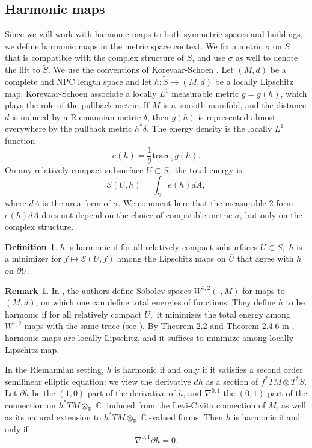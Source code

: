 \documentclass[10pt]{amsart}
\newcommand{\R}{\mathbb R}
\theoremstyle{definition}
\newtheorem{defn}[thm]{Definition}
\newtheorem{remark}[thm]{Remark}
\DeclareMathOperator{\C}{\mathbb{C}}
\begin{document}
\subsection{Harmonic maps}\label{hmapsdefinitions}
Since we will work with harmonic maps to both symmetric spaces and buildings, we define harmonic maps in the metric space context. We fix a metric $\sigma$ on $S$ that is compatible with the complex structure of $S$, and use $\sigma$ as well to denote the lift to $\tilde{S}$. We use the conventions of Korevaar-Schoen \cite{KS}. Let $(M,d)$ be a complete and NPC length space and let $h:\tilde{S}\to (M,d)$ be a locally Lipschitz map. Korevaar-Schoen \cite[Theorem 2.3.2]{KS} associate a locally $L^1$ measurable metric $g=g(h)$, which plays the role of the pullback metric. If $M$ is a smooth manifold, and the distance $d$ is induced by a Riemannian metric $\delta$, then $g(h)$ is represented almost everywhere by the pullback metric $h^*\delta$. The energy density is the locally $L^1$ function 
\begin{equation}\label{mease}
    e(h)=\frac{1}{2}\textrm{trace}_\sigma g(h).
\end{equation}
On any relatively compact subsurface $U\subset S,$ the total energy is
\begin{equation}\label{tot}
    \mathcal{E}(U,h) = \int_U e(h)dA,
\end{equation}
where $dA$ is the area form of $\sigma$. We comment here that the measurable $2$-form $e(h)dA$ does not depend on the choice of compatible metric $\sigma$, but only on the complex structure. 

\begin{defn}\label{def: harmonic}
$h$ is harmonic if for all relatively compact subsurfaces $U\subset S,$ $h$ is a minimizer for $f\mapsto \mathcal{E}(U,f)$ among the Lipschitz maps on $\overline{U}$ that agree with $h$ on $\partial U.$
\end{defn}
\begin{remark}
    In \cite{KS}, the authors define Sobolev spaces $W^{1,2}(\cdot, M)$ for maps to $(M,d)$, on which one can define total energies of functions. They define $h$ to be harmonic if for all relatively compact $U,$ it minimizes the total energy among $W^{1,2}$ maps with the same trace (see \cite[\S 1.12]{KS}). By Theorem 2.2 and Theorem 2.4.6 in \cite{KS}, harmonic maps are locally Lipschitz, and it suffices to minimize among locally Lipschitz map.
\end{remark}


In the Riemannian setting, $h$ is harmonic if and only if it satisfies a second order semilinear elliptic equation: we view the derivative $dh$ as a section of $f^*TM\otimes T^*S$. Let $\partial h$ be the $(1,0)$-part of the derivative of $h$, and $\nabla^{0,1}$ the $(0,1)$-part of the connection on $h^*TM \otimes_\R \C$ induced from the Levi-Civita connection of $M$, as well as its natural extension to $h^*TM\otimes_\R \C$-valued forms. Then $h$ is harmonic if and only if
\begin{equation}\label{hmapequation}
    \nabla^{0,1}\partial h = 0.
\end{equation}
\end{document}
